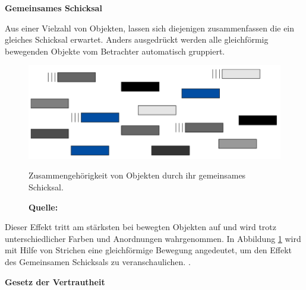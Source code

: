 \textbf{Gemeinsames Schicksal}

Aus einer Vielzahl von Objekten, lassen sich diejenigen zusammenfassen die ein gleiches Schicksal erwartet. Anders ausgedrückt werden alle gleichförmig bewegenden Objekte vom Betrachter automatisch gruppiert.
\begin{figure}[H]
  \centering
  \includegraphics[scale=1]{img/gesetz_des_gemeinsamen_Schicksals.PNG}
  \caption{Zusammengehörigkeit von Objekten durch ihr gemeinsames Schicksal.}
    \caption*{\textbf{Quelle:} \citep{Dahm2006}}
  \label{fig:gemeinsamesSchicksal}
\end{figure}
Dieser Effekt tritt am stärksten bei bewegten Objekten auf und wird trotz unterschiedlicher Farben und Anordnungen wahrgenommen. In Abbildung \ref{fig:gemeinsamesSchicksal} wird mit Hilfe von Strichen eine gleichförmige Bewegung angedeutet, um den Effekt des \glqq Gemeinsamen Schicksals\grqq{} zu veranschaulichen. \citep[vgl.][62]{Dahm2006}.

\textbf{Gesetz der Vertrautheit}

